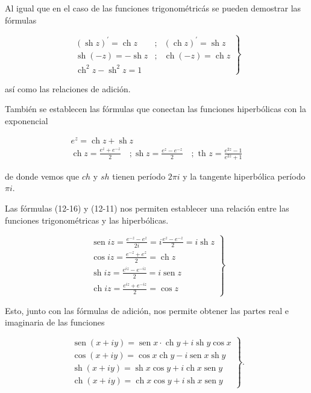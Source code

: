 \documentclass[10pt]{article}
\theoremstyle{plain}
\theoremstyle{definition}
\theoremstyle{remark}
\begin{document}
Al igual que en el caso de las funciones trigonométricás se pueden demostrar las fórmulas

\[
\left.\begin{array}{lll}
(\operatorname{sh} z)^{\prime}=\operatorname{ch} z & ; & (\operatorname{ch} z)^{\prime}=\operatorname{sh} z  \tag{$12\cdot14$}\\
\operatorname{sh}(-z)=-\operatorname{sh} z & ; & \operatorname{ch}(-z)=\operatorname{ch} z \\
\operatorname{ch}^{2} z-\operatorname{sh}^{2} z=1 &
\end{array}\right\}
\]

así como las relaciones de adición.

También se establecen las fórmulas que conectan las funciones hiperbólicas con la exponencial

\begin{gather*}
e^{z}=\operatorname{ch} z+\operatorname{sh} z  \tag{12-15}\\
\operatorname{ch} z=\frac{e^{z}+e^{-z}}{2} \quad ; \operatorname{sh} z=\frac{e^{z}-e^{-z}}{2} \quad ; \text { th } z=\frac{e^{2 z}-1}{e^{2 z}+1} \tag{12-16}
\end{gather*}

de donde vemos que $c h$ y $s h$ tienen período $2 \pi i$ y la tangente hiperbólica período $\pi i$.

Las fórmulas (12-16) y (12-11) nos permiten establecer una relación entre las funciones trigonométricas y las hiperbólicas.

\[
\left.\begin{array}{l}
\operatorname{sen} i z=\frac{e^{-z}-e^{z}}{2 i}=i \frac{e^{z}-e^{-z}}{2}=i \operatorname{sh} z  \tag{12-17}\\
\cos i z=\frac{e^{-z}+e^{z}}{2}=\operatorname{ch} z \\
\operatorname{sh} i z=\frac{e^{i z}-e^{-i z}}{2}=i \operatorname{sen} z \\
\operatorname{ch} i z=\frac{e^{i z}+e^{-i z}}{2}=\cos z
\end{array}\right\}
\]

Esto, junto con las fórmulas de adición, nos permite obtener las partes real e imaginaria de las funciones

\[
\left.\begin{array}{l}
\operatorname{sen}(x+i y)=\operatorname{sen} x \cdot \operatorname{ch} y+i \operatorname{sh} y \cos x  \tag{12-18}\\
\cos (x+i y)=\cos x \operatorname{ch} y-i \operatorname{sen} x \operatorname{sh} y \\
\operatorname{sh}(x+i y)=\operatorname{sh} x \cos y+i \operatorname{ch} x \operatorname{sen} y \\
\operatorname{ch}(x+i y)=\operatorname{ch} x \cos y+i \operatorname{sh} x \operatorname{sen} y
\end{array}\right\} .
\]
\end{document}
